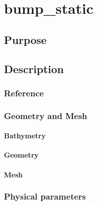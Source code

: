 \chapter{bump\_static}
%
%
\section{Purpose}
%

%
\section{Description}
%
%
%
%
\subsection{Reference}
%

%
%
%
\subsection{Geometry and Mesh}
%
\subsubsection{Bathymetry}
%

%
\subsubsection{Geometry}
%

%
\subsubsection{Mesh}
%

%
%
%
\subsection{Physical parameters}
%

